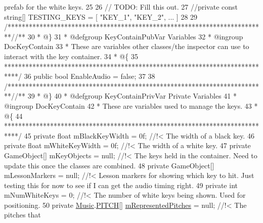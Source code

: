 \begin{DoxyCodeInclude}
{       prefab for the white keys.}
25 \textcolor{comment}{}
26     \textcolor{comment}{// TODO: Fill this out.}
27     \textcolor{comment}{//private const string[] TESTING\_KEYS = [ "KEY\_1", "KEY\_2", ... ]}
28 
29     \textcolor{comment}{/*************************************************************************/}\textcolor{comment}{/** }
30 \textcolor{comment}{    * @\}}
31 \textcolor{comment}{    * @defgroup KeyContainPubVar Variables}
32 \textcolor{comment}{    * @ingroup DocKeyContain}
33 \textcolor{comment}{    * These are variables other classes/the inspector can use to interact with the key container.}
34 \textcolor{comment}{    * @\{}
35 \textcolor{comment}{    ****************************************************************************/}
36     \textcolor{keyword}{public} \textcolor{keywordtype}{bool} EnableAudio = \textcolor{keyword}{false};
37 
38     \textcolor{comment}{/*************************************************************************/}\textcolor{comment}{/** }
39 \textcolor{comment}{    * @\}}
40 \textcolor{comment}{    * @defgroup KeyContainPrivVar Private Variables}
41 \textcolor{comment}{    * @ingroup DocKeyContain}
42 \textcolor{comment}{    * These are variables used to manage the keys.}
43 \textcolor{comment}{    * @\{}
44 \textcolor{comment}{    ****************************************************************************/}
45     \textcolor{keyword}{private} \textcolor{keywordtype}{float} mBlackKeyWidth = 0f; \textcolor{comment}{//!< The width of a black key.}
46 \textcolor{comment}{}    \textcolor{keyword}{private} \textcolor{keywordtype}{float} mWhiteKeyWidth = 0f; \textcolor{comment}{//!< The width of a white key.}
47 \textcolor{comment}{}    \textcolor{keyword}{private} GameObject[] mKeyObjects = null; \textcolor{comment}{//!< The keys held in the container. Need to update this once
       the classes are combined.}
48 \textcolor{comment}{}    \textcolor{keyword}{private} GameObject[] mLessonMarkers = null; \textcolor{comment}{//!< Lesson markers for showing which key to hit. Just
       testing this for now to see if I can get the audio timing right.}
49 \textcolor{comment}{}    \textcolor{keyword}{private} \textcolor{keywordtype}{int} mNumWhiteKeys = 0; \textcolor{comment}{//!< The number of white keys being shown. Used for positioning.}
50 \textcolor{comment}{}    \textcolor{keyword}{private} \hyperlink{class_music}{Music}.\hyperlink{group___music_enums_ga508f69b199ea518f935486c990edac1d}{PITCH}[] \hyperlink{group___key_contain_priv_var_ga103945a6efe3469191e5253d13fec5be}{mRepresentedPitches} = null; \textcolor{comment}{//!< The pitches that
}
\end{DoxyCodeInclude}
